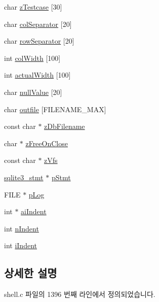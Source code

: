 \begin{DoxyCompactItemize}
\item 
char \hyperlink{struct_shell_state_a8c9b32aa186f1b581fc57f324cad108e}{z\+Testcase} \mbox{[}30\mbox{]}
\item 
char \hyperlink{struct_shell_state_ae9d5cc638c180de0798aeee4f17b416b}{col\+Separator} \mbox{[}20\mbox{]}
\item 
char \hyperlink{struct_shell_state_a576a4b6fd62786683bafb6c7631eae6f}{row\+Separator} \mbox{[}20\mbox{]}
\item 
int \hyperlink{struct_shell_state_adf07d77efc02d83f1c42500ef6a4c433}{col\+Width} \mbox{[}100\mbox{]}
\item 
int \hyperlink{struct_shell_state_ae5e87296fedf861b6013c48f20888c2b}{actual\+Width} \mbox{[}100\mbox{]}
\item 
char \hyperlink{struct_shell_state_a6ae47309eca991773424ffd6b6dd3170}{null\+Value} \mbox{[}20\mbox{]}
\item 
char \hyperlink{struct_shell_state_ab1901d796d12c9fe4859f954fba74235}{outfile} \mbox{[}F\+I\+L\+E\+N\+A\+M\+E\+\_\+\+M\+AX\mbox{]}
\item 
const char $\ast$ \hyperlink{struct_shell_state_a8b887b0d2047997012969639cec7aec1}{z\+Db\+Filename}
\item 
char $\ast$ \hyperlink{struct_shell_state_acd5673a65d8d4aa5a5a674e4ad8a374b}{z\+Free\+On\+Close}
\item 
const char $\ast$ \hyperlink{struct_shell_state_a7a17ec105e801f6d466f3dd8e29521e6}{z\+Vfs}
\item 
\hyperlink{sqlite3_8h_af2a033da1327cdd77f0a174a09aedd0c}{sqlite3\+\_\+stmt} $\ast$ \hyperlink{struct_shell_state_a443b930c7001c9b669728b917c2f5587}{p\+Stmt}
\item 
F\+I\+LE $\ast$ \hyperlink{struct_shell_state_a9ca42a0d7bf19e576de8ea13ba40b61c}{p\+Log}
\item 
int $\ast$ \hyperlink{struct_shell_state_a0481fdd4a0c88fb17f1a66ba87939ce9}{ai\+Indent}
\item 
int \hyperlink{struct_shell_state_a73e3fe627474f4de6c0e04837ee0b0bd}{n\+Indent}
\item 
int \hyperlink{struct_shell_state_a08d5d59ae0d44497aca79e89a5b8f0fe}{i\+Indent}
\end{DoxyCompactItemize}


\subsection{상세한 설명}


shell.\+c 파일의 1396 번째 라인에서 정의되었습니다.



